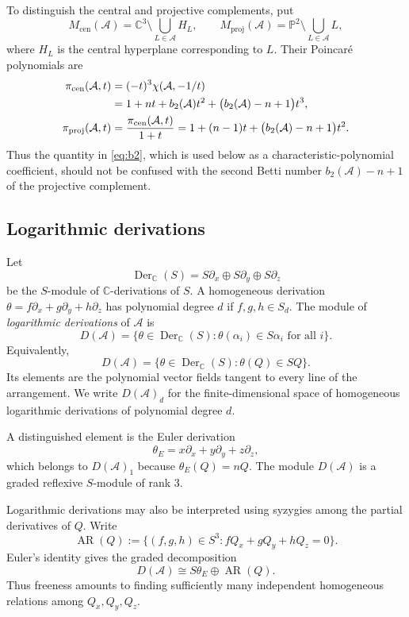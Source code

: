 \documentclass[pdflatex,sn-mathphys-num]{sn-jnl}%
\theoremstyle{remark}
\theoremstyle{definition}
\begin{document}
To distinguish the central and projective complements, put
\[
M_{\mathrm{cen}}(\mathcal{A})
=\mathbb C^3\setminus\bigcup_{L\in\mathcal{A}}H_L,
\qquad
M_{\mathrm{proj}}(\mathcal{A})
=\mathbb P^2\setminus\bigcup_{L\in\mathcal{A}}L,
\]
where $H_L$ is the central hyperplane corresponding to $L$. Their Poincar\'e
polynomials are
\begin{align}
\pi_{\mathrm{cen}}(\mathcal{A},t)
&=(-t)^3\chi(\mathcal{A},-1/t) \notag\\
&=1+nt+b_2(\mathcal{A})t^2
+\bigl(b_2(\mathcal{A})-n+1\bigr)t^3,
\label{eq:poincare-central}
\\
\pi_{\mathrm{proj}}(\mathcal{A},t)
&=\frac{\pi_{\mathrm{cen}}(\mathcal{A},t)}{1+t}
=1+(n-1)t+\bigl(b_2(\mathcal{A})-n+1\bigr)t^2.
\label{eq:poincare-projective}
\end{align}
Thus the quantity in \eqref{eq:b2}, which is used below as a
characteristic-polynomial coefficient, should not be confused with the second
Betti number $b_2(\mathcal{A})-n+1$ of the projective complement.

\subsection{Logarithmic derivations}

Let
\[
\operatorname{Der}_{\mathbb C}(S)
=S\partial_x\oplus S\partial_y\oplus S\partial_z
\]
be the $S$-module of $\mathbb C$-derivations of $S$. A homogeneous derivation
$\theta=f\partial_x+g\partial_y+h\partial_z$ has polynomial degree $d$ if
$f,g,h\in S_d$. The module of \emph{logarithmic derivations} of $\mathcal{A}$ is
\[
D(\mathcal{A})
=\bigl\{\theta\in\operatorname{Der}_{\mathbb C}(S):
\theta(\alpha_i)\in S\alpha_i\text{ for all }i\bigr\}.
\]
Equivalently,
\[
D(\mathcal{A})
=\{\theta\in\operatorname{Der}_{\mathbb C}(S):
\theta(Q)\in SQ\}.
\]
Its elements are the polynomial vector fields tangent to every line of the arrangement. We write $D(\mathcal{A})_d$ for the finite-dimensional space of homogeneous logarithmic derivations of polynomial degree $d$.

A distinguished element is the Euler derivation
\[
\theta_E=x\partial_x+y\partial_y+z\partial_z,
\]
which belongs to $D(\mathcal{A})_1$ because $\theta_E(Q)=nQ$. The module $D(\mathcal{A})$ is a graded reflexive $S$-module of rank $3$.

Logarithmic derivations may also be interpreted using syzygies among the partial derivatives of $Q$. Write
\[
\operatorname{AR}(Q)
:=\{(f,g,h)\in S^3:fQ_x+gQ_y+hQ_z=0\}.
\]
Euler's identity gives the graded decomposition
\[
D(\mathcal{A})\cong S\theta_E\oplus\operatorname{AR}(Q).
\]
Thus freeness amounts to finding sufficiently many independent homogeneous relations among $Q_x,Q_y,Q_z$.
\end{document}
